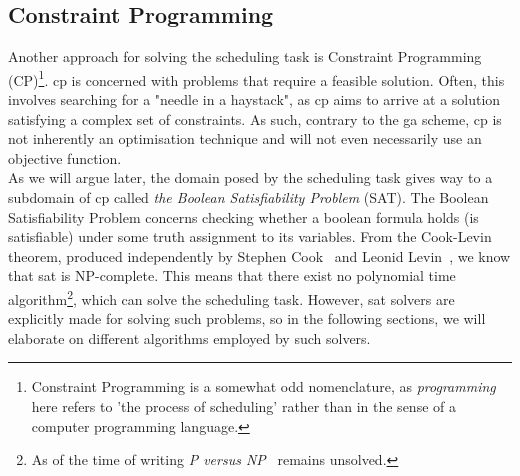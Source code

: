 \subsection{Constraint Programming}\label{sec:Constraint_Programming}
Another approach for solving the scheduling task is Constraint Programming (CP)\footnote{Constraint Programming is a somewhat odd nomenclature, as \textit{programming} here refers to 'the process of scheduling' rather than in the sense of a computer programming language.}. \acrshort{cp} is concerned with problems that require a feasible solution. Often, this involves searching for a "needle in a haystack", as \acrshort{cp} aims to arrive at a solution satisfying a complex set of constraints. As such, contrary to the \acrshort{ga} scheme, \acrshort{cp} is not inherently an optimisation technique and will not even necessarily use an objective function.
\\
As we will argue later, the domain posed by the scheduling task gives way to a subdomain of \acrshort{cp} called \textit{the Boolean Satisfiability Problem} (SAT). The Boolean Satisfiability Problem concerns checking whether a boolean formula holds (is satisfiable) under some truth assignment to its variables. From the Cook-Levin theorem, produced independently by Stephen Cook~\cite{cook-bool-SAT} and Leonid Levin~\cite{Levin-bool-SAT}, we know that \acrshort{sat} is NP-complete. This means that there exist no polynomial time algorithm\footnote{As of the time of writing \textit{P versus NP}~\cite{Wiki-P-vs-NP} remains unsolved.}, which can solve the scheduling task. However, \acrshort{sat} solvers are explicitly made for solving such problems, so in the following sections, we will elaborate on different algorithms employed by such solvers.

